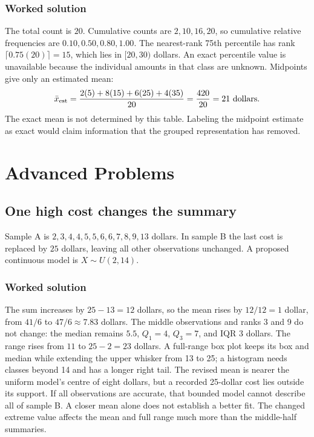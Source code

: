 \subsubsection*{Worked solution}\label{sol:sec:general-worked2}
The total count is $20$. Cumulative counts are $2,10,16,20$, so cumulative relative frequencies are $0.10,0.50,0.80,1.00$. The nearest-rank 75th percentile has rank $\lceil0.75(20)\rceil=15$, which lies in $[20,30)$ dollars.
An exact percentile value is unavailable because the individual amounts in that class are unknown. Midpoints give only an estimated mean:
\[
\bar x_{\rm est}=\frac{2(5)+8(15)+6(25)+4(35)}{20}
=\frac{420}{20}=21\text{ dollars}.
\]
The exact mean is not determined by this table. Labeling the midpoint estimate as exact would claim information that the grouped representation has removed.
\section{Advanced Problems}\label{sec:advanced}

\subsection{One high cost changes the summary}\label{prob:sec:advanced0}
Sample A is $2,3,4,4,5,5,6,6,7,8,9,13$ dollars. In sample B the last cost is replaced by $25$ dollars, leaving all other observations unchanged. A proposed continuous model is $X\sim U(2,14)$.
\subsubsection*{Worked solution}\label{sol:sec:advanced0}
The sum increases by $25-13=12$ dollars, so the mean rises by $12/12=1$ dollar, from $41/6$ to $47/6\approx7.83$ dollars. The middle observations and ranks 3 and 9 do not change: the median remains $5.5$, $Q_1=4$, $Q_3=7$, and IQR $3$ dollars. The range rises from $11$ to $25-2=23$ dollars. A full-range box plot keeps its box and median while extending the upper whisker from 13 to 25; a histogram needs classes beyond 14 and has a longer right tail.
The revised mean is nearer the uniform model's centre of eight dollars, but a recorded 25-dollar cost lies outside its support. If all observations are accurate, that bounded model cannot describe all of sample B. A closer mean alone does not establish a better fit. The changed extreme value affects the mean and full range much more than the middle-half summaries.



